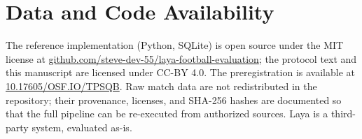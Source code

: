 \documentclass[11pt]{article}
\newcommand{\GitHubURL}{\href{https://github.com/steve-dev-55/laya-football-evaluation}{github.com/steve-dev-55/laya-football-evaluation}}
\newcommand{\OsfDOI}{\href{https://doi.org/10.17605/OSF.IO/TPSQB}{10.17605/OSF.IO/TPSQB}}
\begin{document}
\section*{Data and Code Availability}
The reference implementation (Python, SQLite) is open source under the MIT
license at \GitHubURL{}; the protocol text and this manuscript are licensed
under CC-BY 4.0. The preregistration is available at \OsfDOI{}. Raw match
data are not redistributed in the repository; their provenance, licenses, and
SHA-256 hashes are documented so that the full pipeline can be re-executed
from authorized sources. Laya is a third-party system, evaluated as-is.



\end{document}
